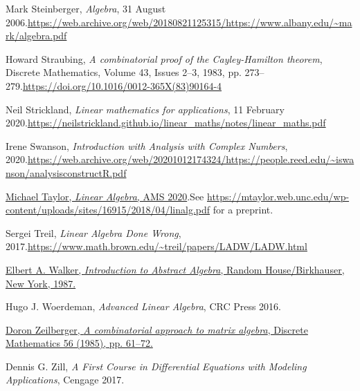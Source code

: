 \documentclass[numbers=enddot,12pt,final,onecolumn,notitlepage]{scrartcl}%
\numberwithin{exer}{subsection}
\theoremstyle{definition}
\begin{document}
\begin{thebibliography}{99999999}
Mark Steinberger, \textit{Algebra}, 31 August
2006.\newline\url{https://web.archive.org/web/20180821125315/https://www.albany.edu/~mark/algebra.pdf}

Howard Straubing, \textit{A combinatorial proof of
the Cayley-Hamilton theorem}, Discrete Mathematics, Volume 43, Issues 2--3,
1983, pp. 273--279.\newline\url{https://doi.org/10.1016/0012-365X(83)90164-4}

Neil Strickland, \textit{Linear mathematics for
applications}, 11 February 2020.\newline\url{https://neilstrickland.github.io/linear_maths/notes/linear_maths.pdf}

Irene Swanson, \textit{Introduction with Analysis
with Complex Numbers}, 2020.\newline\url{https://web.archive.org/web/20201012174324/https://people.reed.edu/~iswanson/analysisconstructR.pdf}

%
\href{https://bookstore.ams.org/amstext-45/}{Michael Taylor, \textit{Linear
Algebra}, AMS 2020}.\newline See
\url{https://mtaylor.web.unc.edu/wp-content/uploads/sites/16915/2018/04/linalg.pdf}
for a preprint.

Sergei Treil, \textit{Linear Algebra Done Wrong},
2017.\newline\url{https://www.math.brown.edu/~treil/papers/LADW/LADW.html}

%
\href{https://web.archive.org/web/20170809055317/https://www.math.nmsu.edu/~elbert/AbsAlgeb.pdf}{Elbert
A. Walker, \textit{Introduction to Abstract Algebra}, Random House/Birkhauser,
New York, 1987.}

Hugo J. Woerdeman, \textit{Advanced Linear
Algebra}, CRC Press 2016.

%
\href{http://www.math.rutgers.edu/~zeilberg/mamarimY/DM85.pdf}{Doron
Zeilberger, \textit{A combinatorial approach to matrix algebra}, Discrete
Mathematics 56 (1985), pp. 61--72.}

Dennis G. Zill, \textit{A First Course in Differential
Equations with Modeling Applications}, Cengage 2017.
\end{thebibliography}
\end{document}
